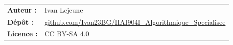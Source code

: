 \begin{titlepage}
    \vfill

    \raggedright
    \small
    \begin{tabular}{@{} l l @{}}
        \textbf{Auteur :} & Ivan Lejeune \\
        \textbf{Dépôt :} & \href{https://github.com/Ivan23BG/HAI904I_Algorithmique_Specialisee}{\color{exocolor}github.com/Ivan23BG/HAI904I\_Algorithmique\_Specialisee} \\ %
        \textbf{Licence :} & \color{fallbackcolor} CC BY-SA 4.0
    \end{tabular}

    \clearpage
\end{titlepage}
\pagecolor{bgcolor} %
